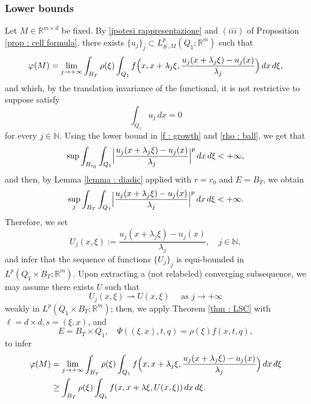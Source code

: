 \documentclass{article}
\theoremstyle{definition}
\newcommand{\f}{\varphi}
\newcommand{\N}{\mathbb{N}}
\newcommand{\R}{\mathbb{R}}
\begin{document}
\subsubsection{Lower bounds}

Let $M\in \R^{m\times d}$ be fixed. By \eqref{ipotesi rappresentazione} and $(iii)$ of Proposition \ref{prop : cell formula}, there exists $\{u_j\}_j\subset L^p_{\#,M}(Q_1; \R^m)$ such that
\begin{equation*}
\f(M)=\lim_{j\to+\infty} \int_{B_T} \rho(\xi)\int_{Q_1} f\Bigl(x,x+\lambda_j\xi,\frac{u_j(x+\lambda_j\xi)-u_j(x)}{\lambda_j}\Bigr)\, dx\,d\xi ,
\end{equation*}
and which, by the translation invariance of the functional, it is not restrictive to suppose satisfy
\begin{equation}\label{mean value bis}
    \int_{Q_1} u_j\, dx = 0
\end{equation}
for every $j\in\N$. Using the lower bound in \eqref{f : growth} and \eqref{rho : ball}, we get that
\begin{equation*}
\sup \int_{B_{r_0}} \int_{Q_1}\Bigl|\frac{u_j(x+\lambda_j\xi)-u_j(x)}{\lambda_j}\Bigr|^p \, dx\,d\xi<+\infty,
\end{equation*}
and then, by Lemma \ref{lemma : diadic} applied with $r=r_0$ and $E=B_T$, we obtain
\begin{equation}\label{preliminarybound}
 \sup_{j} \int_{B_{T}} \int_{Q_1}\Bigl|\frac{u_j(x+\lambda_j\xi)-u_j(x)}{\lambda_j}\Bigr|^p \, dx\,d\xi<+\infty.
\end{equation}
Therefore, we set
\begin{equation*}
    U_j(x,\xi):=\frac{u_j(x+\lambda_j\xi)-u_j(x)}{\lambda_j}, \quad j\in\N,
\end{equation*}
and infer that the sequence of functions $\{U_j\}_j$ is equi-bounded in $L^p(Q_1\times B_T; \R^m)$. Upon extracting a (not relabeled) converging subsequence, we may assume there exists $U$ such that 
\begin{equation}\label{weaksub}
     U_j(x,\xi) \rightharpoonup U(x,\xi) \quad \text{ as } j\to+\infty
\end{equation}
weakly in $L^p(Q_1\times B_T; \R^m)$; then, we apply Theorem \ref{thm : LSC} with $\ell=d\times d, s=(\xi,x)$, and
\begin{equation*}
   E=B_T\times Q_1,  \quad  \Psi((\xi,x),t,q)=\rho(\xi)f(x,t,q),
\end{equation*}
to infer
\begin{align} \nonumber
\f(M)& =\lim_{j\to+\infty} \int_{B_T} \rho(\xi)\int_{Q_1} f\Bigl(x,x+\lambda_j\xi,\frac{u_j(x+\lambda_j\xi)-u_j(x)}{\lambda_j}\Bigr)\, dx\,d\xi \\ \label{lowerboundgenerale}
& \geq \int_{B_T} \rho(\xi)\int_{Q_1} f(x, x+\lambda\xi, U(x,\xi))\, dx\,d\xi.
\end{align}
\end{document}
